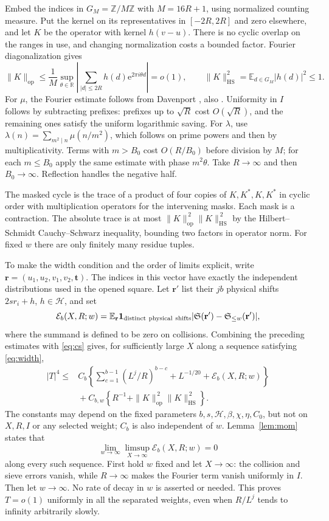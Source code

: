 \documentclass[11pt]{article}
\newcommand{\E}{\mathbb E}
\newcommand{\Z}{\mathbb Z}
\newcommand{\one}{\mathbf 1}
\newcommand{\Sf}{\mathfrak S}
\newcommand{\op}{\mathrm{op}}
\newcommand{\HS}{\mathrm{HS}}
\newcommand{\e}{\mathrm e}
\begin{document}
Embed the indices in \(G_M=\Z/M\Z\) with \(M=16R+1\), using normalized
counting measure. Put the kernel on its representatives in \([-2R,2R]\)
and zero elsewhere, and let \(K\) be the operator with kernel \(h(v-u)\).
There is no cyclic overlap on the ranges in use, and changing normalization
costs a bounded factor. Fourier diagonalization gives
\[
 \|K\|_{\op}
 \le\frac1M\sup_{\theta\in\mathbb R}
          \left|\sum_{|d|\le2R} h(d)\e^{2\pi i\theta d}\right|=o(1),
 \qquad \|K\|_{\HS}^2=\E_{d\in G_M}|h(d)|^2\le1.
\]
For \(\mu\), the Fourier estimate follows from Davenport
\cite{dav}, also \cite[(1.1)]{gtnil}. Uniformity in \(I\) follows by
subtracting prefixes: prefixes up to \(\sqrt R\) cost \(O(\sqrt R)\),
and the remaining ones satisfy the uniform logarithmic saving. For
\(\lambda\), use \(\lambda(n)=\sum_{m^2\mid n}\mu(n/m^2)\), which follows
on prime powers and then by multiplicativity. Terms with \(m>B_0\)
cost \(O(R/B_0)\) before division by \(M\); for each \(m\le B_0\) apply
the same estimate with phase \(m^2\theta\). Take \(R\to\infty\) and then
\(B_0\to\infty\). Reflection handles the negative half.

The masked cycle is the trace of a product of four copies of \(K,K^*,K,K^*\)
in cyclic order with multiplication operators for the intervening masks.
Each mask is a contraction. The absolute trace is at most
\(\|K\|_{\op}^{\,2}\|K\|_{\HS}^{\,2}\) by the Hilbert--Schmidt
Cauchy--Schwarz inequality, bounding two factors in operator norm.
For fixed \(w\) there are only finitely many residue tuples.

To make the width condition and the order of limits explicit, write
\(\mathbf r=(u_1,u_2,v_1,v_2,\mathbf t)\). The indices in this vector
have exactly the independent distributions used in the opened square.
Let \(\mathbf r'\) list their \(jb\) physical shifts \(2sr_i+h\),
\(h\in\mathcal H\), and set
\[
 \mathcal E_b(X,R;w)=
 \E_{\mathbf r}\one_{\rm distinct\ physical\ shifts}
       |\Sf(\mathbf r')-\Sf_{\le w}(\mathbf r')|,
\]
where the summand is defined to be zero on collisions. Combining the
preceding estimates with \eqref{eq:cs} gives, for sufficiently large
\(X\) along a sequence satisfying \eqref{eq:width},
\begin{align}
 |T|^4 \le{}& C_b\left\{
       \sum_{c=1}^{b-1}(L^j/R)^{b-c}
       +L^{-1/20}+\mathcal E_b(X,R;w)\right\} \nonumber\\
 &{}+C_{b,w}\left\{R^{-1}
       +\|K\|_{\op}^{\,2}\|K\|_{\HS}^{\,2}\right\}.
 \label{eq:combined-error}
\end{align}
The constants may depend on the fixed parameters
\(b,s,\mathcal H,\beta,\chi,\eta,C_0\), but not on \(X,R,I\) or any
selected weight; \(C_b\) is also independent of \(w\).
Lemma~\ref{lem:mom} states that
\[
 \lim_{w\to\infty}\limsup_{X\to\infty}
       \mathcal E_b(X,R;w)=0
\]
along every such sequence. First hold \(w\) fixed and let \(X\to\infty\):
the collision and sieve errors vanish, while \(R\to\infty\) makes the
Fourier term vanish uniformly in \(I\). Then let \(w\to\infty\).
No rate of decay in \(w\) is asserted or needed. This proves
\(T=o(1)\) uniformly in all the separated weights, even when
\(R/L^j\) tends to infinity arbitrarily slowly.
\end{document}
